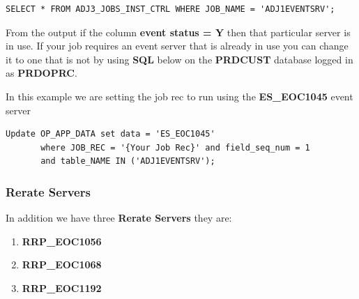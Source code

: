 \documentclass[12pt,twoside]{article}
\begin{document}
\begin{verbatim}
SELECT * FROM ADJ3_JOBS_INST_CTRL WHERE JOB_NAME = 'ADJ1EVENTSRV';
\end{verbatim}

From the output if the column \textbf{event status = Y} then that
particular server is in use. If your job requires an event
server that is already in use you can change it to one that is
not by using \textbf{SQL} below on the \textbf{PRDCUST} database logged in as
\textbf{PRDOPRC}.

In this example we are setting the job rec to run using the
\textbf{ES\_EOC1045} event server

\begin{verbatim}
Update OP_APP_DATA set data = 'ES_EOC1045'
       where JOB_REC = '{Your Job Rec}' and field_seq_num = 1 
       and table_NAME IN ('ADJ1EVENTSRV');
\end{verbatim}

\subsubsection{Rerate Servers}
\label{sec:orgheadline4}
In addition we have three \textbf{Rerate Servers} they are:
\begin{enumerate}
\item \textbf{RRP\_EOC1056}
\item \textbf{RRP\_EOC1068}
\item \textbf{RRP\_EOC1192}
\end{enumerate}
\end{document}
